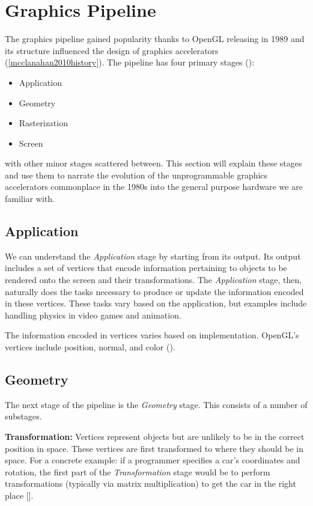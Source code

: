 \section{Graphics Pipeline}

The graphics pipeline gained popularity thanks to OpenGL releasing in 1989 and its structure influenced the design of graphics accelerators 
(\ref{mcclanahan2010history}).
The pipeline has four primary stages (\cite{crow2004evolution}):

\begin{itemize}
    \item Application
    \item Geometry
    \item Rasterization
    \item Screen
\end{itemize}

with other minor stages scattered between.
This section will explain these stages and use them to narrate the evolution of the unprogrammable graphics accelerators commonplace in the 1980s into the general purpose hardware we are familiar with.

\subsection{Application}

We can understand the \textit{Application} stage by starting from its output.
Its output includes a set of vertices that encode information pertaining to objects to be rendered onto the screen and their transformations.
The \textit{Application} stage, then, naturally does the tasks necessary to produce or update the information encoded in these vertices.
These tasks vary based on the application, but examples include handling physics in video games and animation.

The information encoded in vertices varies based on implementation. OpenGL's vertices include position, normal, and color (\cite{wiki:vertex}).

\subsection{Geometry}

The next stage of the pipeline is the \textit{Geometry} stage. 
This consists of a number of substages.

\textbf{Transformation:}
Vertices represent objects but are unlikely to be in the correct position in space.
These vertices are first transformed to where they should be in space.
For a concrete example: if a programmer specifies a car's coordinates and
rotation, the first part of the \textit{Transformation} stage would be to perform
transformations (typically via matrix multiplication) to get the car in the
right place [\cite{nvidia256}].

